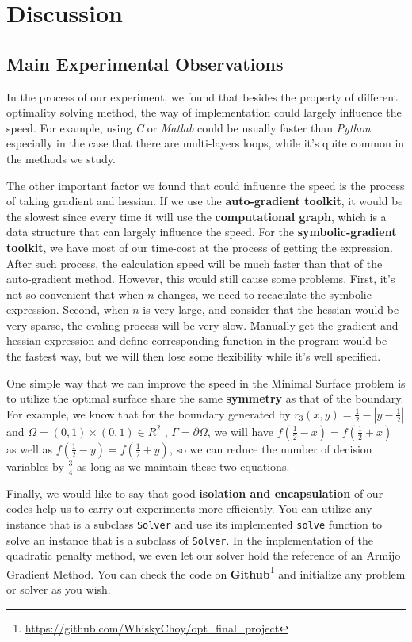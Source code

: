 \section{Discussion}
\subsection{Main Experimental Observations}
In the process of our experiment, we found that besides the property of different optimality solving method, the way of implementation could largely influence the speed. For example, using \textit{C} or \textit{Matlab} could be usually faster than \textit{Python} especially in the case that there are multi-layers loops, while it's quite common in the methods we study.

The other important factor we found that could influence the speed is the process of taking gradient and hessian. If we use the \textbf{auto-gradient toolkit}, it would be the slowest since every time it will use the \textbf{computational graph}, which is a data structure that can largely influence the speed. For the \textbf{symbolic-gradient toolkit}, we have most of our time-cost at the process of getting the expression. After such process, the calculation speed will be much faster than that of the auto-gradient method. However, this would still cause some problems. First, it's not so convenient that when $n$ changes, we need to recaculate the symbolic expression. Second, when $n$ is very large, and consider that the hessian would be very sparse, the evaling process will be very slow. Manually get the gradient and hessian expression and define corresponding function in the program would be the fastest way, but we will then lose some flexibility while it's well specified.

One simple way that we can improve the speed in the Minimal Surface problem is to utilize the optimal surface share the same \textbf{symmetry} as that of the boundary. For example, we know that for the boundary generated by $r_3(x,y) = \frac{1}{2} - |y - \frac{1}{2}|$ and $\Omega = (0,1) \times (0,1) \in R^2$ , $\Gamma=\partial \Omega$, we will have $f(\frac{1}{2}-x)=f(\frac{1}{2}+x)$ as well as $f(\frac{1}{2}-y)=f(\frac{1}{2}+y)$, so we can reduce the number of decision variables by $\frac{3}{4}$ as long as we maintain these two equations.

Finally, we would like to say that good \textbf{isolation and encapsulation} of our codes help us to carry out experiments more efficiently. You can utilize any instance that is a subclass \texttt{Solver} and use its implemented \texttt{solve} function to solve an instance that is a subclass of \texttt{Solver}. In the implementation of the quadratic penalty method, we even let our solver hold the reference of an Armijo Gradient Method. You can check the code on \textbf{Github}\footnote{\url{https://github.com/WhiskyChoy/opt_final_project}} and initialize any problem or solver as you wish.

